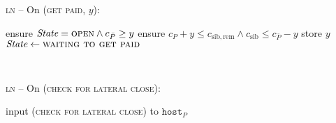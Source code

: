\begin{center}
  \begin{processbox}{\textsc{ln} -- On (\textsc{get paid}, $y$):}
    \begin{algorithmic}[1]
      \State ensure $\itistate = \textsc{open} \wedge c_{\bar{P}} \geq y$
       
        \State ensure $c_P + y \leq c_{\mathrm{sib}, \mathrm{rem}} \wedge
        c_{\mathrm{sib}} \leq c_{\bar{P}} - y$ 
      \EndIf
      \State store $y$
      \State $\itistate \gets \textsc{waiting to get paid}$
      \label{code:ln:get-paid:state}
    \end{algorithmic}
  \end{processbox}
  \label{code:ln:get-paid}
\end{center} \ \\

\begin{center}
  \begin{processbox}{\textsc{ln} -- On (\textsc{check for lateral close}):}
    \begin{algorithmic}[1]
        \State input (\textsc{check for lateral close}) to
        $\texttt{host}_P$
      \EndIf
    \end{algorithmic}
  \end{processbox}
  \label{code:ln:poll-virtual}
\end{center} \ \\

